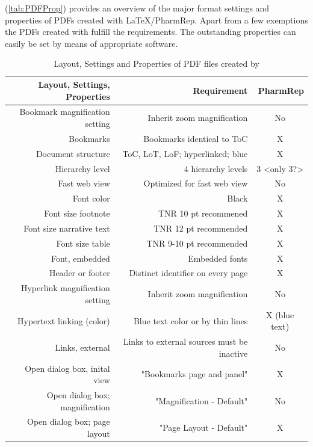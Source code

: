 (\autoref{tab:PDFProp}) provides an overview of the major format settings and properties of PDFs created with \LaTeX{}/PharmRep. Apart from a few exemptions the PDFs created with \PharmRep fulfill the requirements. The outstanding properties can easily be set by means of appropriate software.

\begin{table}[htbp]
\centering
\caption{Layout, Settings and Properties of PDF files created by \PharmRep}\label{tab:PDFProp}
\begin{tabular}{rrr}
\toprule
Layout, Settings, Properties & Requirement & PharmRep \\
\midrule
Bookmark magnification setting  & Inherit zoom magnification & \multicolumn{1}{c}{No} \\
Bookmarks & Bookmarks identical to ToC & \multicolumn{1}{c}{X} \\
Document structure & ToC, LoT, LoF; hyperlinked; blue  & \multicolumn{1}{c}{X} \\
Hierarchy level & 4 hierarchy levels & \multicolumn{1}{c}{3 <only 3?>} \\
Fast web view  & Optimized for fast web view & \multicolumn{1}{c}{No} \\
Font color & Black  & \multicolumn{1}{c}{X} \\
Font size footnote & TNR 10 pt recommened & \multicolumn{1}{c}{X} \\
Font size narrative text & TNR 12 pt recommended & \multicolumn{1}{c}{X} \\
Font size table & TNR 9-10 pt recommended & \multicolumn{1}{c}{X} \\
Font, embedded & Embedded fonts  & \multicolumn{1}{c}{X} \\
Header or footer & Distinct identifier on every page & \multicolumn{1}{c}{X} \\
Hyperlink magnification setting & Inherit zoom magnification & \multicolumn{1}{c}{No} \\
Hypertext linking (color) & Blue text color or by thin lines  & \multicolumn{1}{c}{X (blue text)} \\
Links, external & Links to external sources must be inactive  & \multicolumn{1}{c}{No} \\
Open dialog box, inital view & "Bookmarks page and panel"  & \multicolumn{1}{c}{X} \\
Open dialog box; magnification & "Magnification - Default" & \multicolumn{1}{c}{No } \\
Open dialog box; page layout & "Page Layout - Default" & \multicolumn{1}{c}{X} \\

\end{tabular}
\end{table}

